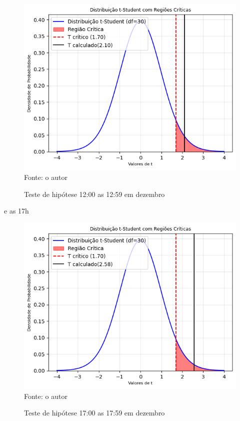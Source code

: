 \begin{figure}[H]
    \centering
    \caption{Teste de hipótese 12:00 as 12:59  em dezembro}
    \includegraphics[width=1\linewidth]{Imagens/122.png}
    {\footnotesize\\ Fonte: o autor}
    \label{fig:t122}
\end{figure}

e as 17h
\begin{figure}[H]
    \centering
    \caption{Teste de hipótese 17:00 as 17:59  em dezembro}
    \includegraphics[width=1\linewidth]{Imagens/172.png}
    {\footnotesize\\ Fonte: o autor}
    \label{fig:t172}
\end{figure}

